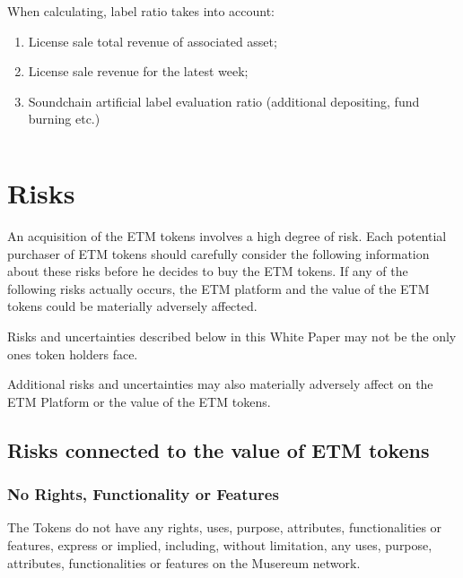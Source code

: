 \documentclass[12pt]{report}
\begin{document}
When calculating, label ratio takes into account:
\begin{enumerate}
	\item License sale total revenue of associated asset;
	\item License sale revenue for the latest week;
	\item Soundchain artificial label evaluation ratio (additional depositing, fund burning etc.)
\end{enumerate}
\begin{equation}
\end{equation}



\chapter{Risks}
\label{risks}

An acquisition of the ETM tokens involves a high degree of risk. Each potential purchaser of ETM tokens should carefully consider the following information about these risks before he decides to buy the ETM tokens. If any of the following risks actually occurs, the ETM platform and the value of the ETM tokens could be materially adversely affected.

Risks and uncertainties described below in this White Paper may not be the only ones token holders face.

Additional risks and uncertainties may also materially adversely affect on the ETM Platform or the value of the ETM tokens.

\section{Risks connected to the value of ETM tokens}
\label{risks-value}
\subsection*{No Rights, Functionality or Features}
\label{risks-value-rights}
The Tokens do not have any rights, uses, purpose, attributes, functionalities or features, express or implied, including, without limitation, any uses, purpose, attributes, functionalities or features on the Musereum network.
\end{document}
